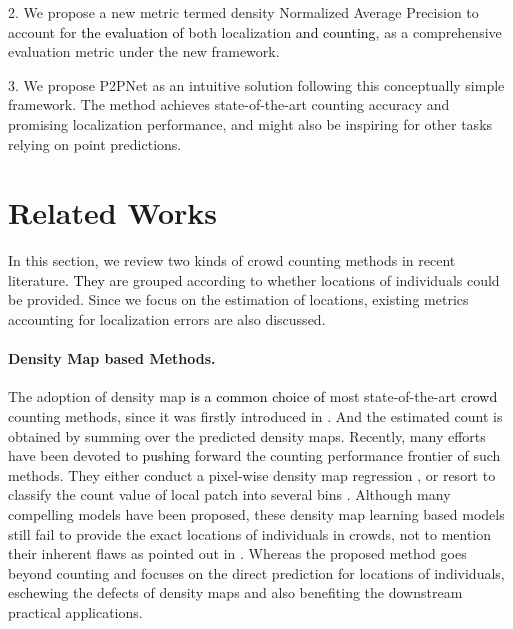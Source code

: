 \documentclass[10pt,twocolumn,letterpaper]{article}
\newcommand{\ywunew}[1]{\textcolor{black}{#1}}
\newcommand{\ywu}[1]{\textcolor{black}{#1}}
\begin{document}
2. We propose a new metric termed density Normalized Average Precision to account for \ywunew{the evaluation of} both localization \ywunew{and counting}, as a comprehensive evaluation metric under the new framework.

3. We propose P2PNet as an intuitive solution following this conceptually simple framework. The method achieves state-of-the-art counting accuracy and promising localization performance, and might also be inspiring for other tasks relying on point predictions.

\section{Related Works}
In this section, we review two kinds of crowd counting methods in recent literature\ywu{. They} are grouped according to whether locations of individuals could be provided. Since we focus on the estimation of locations, existing metrics accounting for localization errors are also discussed.
\vspace{-1.0em}
\paragraph{Density Map based Methods.}The adoption of density map \ywu{is a common choice of} most state-of-the-art \ywu{crowd} counting methods, since it was firstly introduced in \cite{lempitsky2010learning}. And the estimated count is obtained by summing over the predicted density maps. Recently, many efforts have been devoted to \ywu{pushing} forward the counting performance frontier of such methods. They either conduct a pixel-wise density map regression \cite{li2018csrnet,miao2020shallow,jiang2020attention,bai2020adaptive,liu2020adaptive,hu2020count}, or resort to classify the count value of local patch into several bins \cite{xiong2019open,liu2019counting,liu2020weighing}. Although many compelling models have been proposed, these density map learning based models still fail to provide the exact locations of individuals in crowds, not to mention their inherent flaws as pointed out in \cite{bai2020adaptive,ma2019bayesian,liu2019counting}. Whereas the proposed method goes beyond counting and focuses on the direct prediction for locations of individuals, eschewing the defects of density maps and also benefiting the downstream practical applications.
\vspace{-1.0em}
\end{document}
